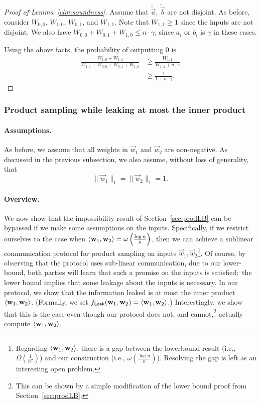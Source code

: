 \begin{proof}[Proof of Lemma~\ref{clm:soundness}]
Assume that $\tilde{\vec{a}}$,
$\tilde{\vec{b}}$ are not disjoint.
As before, consider $W_{0,0}$, $W_{1,0}$, $W_{0,1}$, and $W_{1,1}$. 
Note that $W_{1,1} \geq 1$ since the inputs are not disjoint. We also
have $W_{0,0} + W_{0,1} + W_{1,0} \leq n \cdot \gamma$, since $a_i$ or
$b_i$ is $\gamma$ in these cases. 


Using the above facts, the probability of outputting $0$
is 
\begin{align*}
\frac{W_{1,0} + W_{1,1}}{W_{1,1} + W_{0,0} + W_{0,1} + W_{1,0}}
&\geq
\frac{W_{1,1}}{W_{1,1} + n \cdot \gamma}\\
&\ge \frac{1}{1 + n \cdot \gamma}.
\end{align*} 
\end{proof}


\subsubsection{Product sampling while leaking at most the inner product}
\label{sec:prodip}

\paragraph{Assumptions.}
As before, we assume that all weights in $\vec{w}_1$ and $\vec{w}_2$ are
non-negative. As discussed in the previous subsection, we also assume,
without loss of generality, that $$\| \vec{w}_1 \|_1 = \| \vec{w}_2 \|_1
= 1.$$ 

\paragraph{Overview.}
We now show that the impossibility result of Section~\ref{sec:prodLB}
can be bypassed if we make some assumptions on the inputs.
Specifically, if we restrict ourselves to the case when
$\langle \mathbf{w}_1, \mathbf{w}_2 \rangle=\omega\left(\frac{\log n}{n}\right)$, then we can achieve a sublinear
communication protocol for product sampling on inputs $\vec{w}_1,
\vec{w}_2$\footnote{Regarding $\langle \mathbf{w}_1, \mathbf{w}_2 \rangle$, there is a gap between the
lowerbound result (i.e., $\Omega(\frac{1}{n^2})$) and our construction
(i.e., $\omega(\frac{\log n}{n})$). Resolving the gap is left as an
interesting open problem.}.
Of course, by observing that the protocol uses sub-linear
communication, due to our lower-bound, both parties will learn that such
a promise on the inputs is satisfied;~the lower bound implies that some
leakage about the inputs is necessary.  
%
In our protocol, we show that the information leaked is at most the
inner product $\langle \mathbf{w}_1, \mathbf{w}_2 \rangle$.
(Formally, we set $f_{\mathsf{Leak}}(\mathbf{w}_1, \mathbf{w}_2) =\langle \mathbf{w}_1, \mathbf{w}_2 \rangle$.)  Interestingly, we show that
this is the case even though our protocol does not, and
cannot,\footnote{This can be shown by a simple modification of the lower
bound proof from Section~\ref{sec:prodLB}.} actually compute $\langle \mathbf{w}_1, \mathbf{w}_2 \rangle$.


